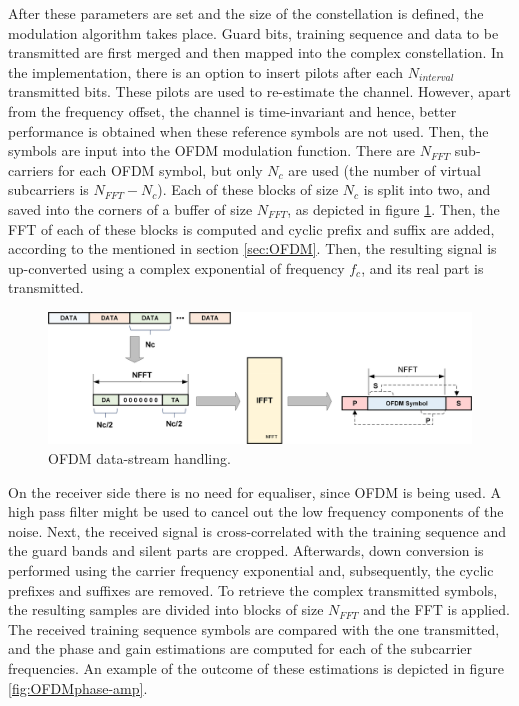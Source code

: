 \documentclass[12pt,a4paper,openright]{report}
\begin{document}
After these parameters are set and the size of the constellation is defined, the modulation algorithm takes place. Guard bits, training sequence and data to be transmitted are first merged and then mapped into the complex constellation. In the implementation, there is an option to insert pilots after each $N_{interval}$ transmitted bits. These pilots are used to re-estimate the channel. However, apart from the frequency offset, the channel is time-invariant and hence, better performance is obtained when these reference symbols are not used. Then, the symbols are input into the OFDM modulation function. There are $N_{FFT}$ sub-carriers for each OFDM symbol, but only $N_c$ are used (the number of virtual subcarriers is $N_{FFT}-N_c$). Each of these blocks of size $N_c$ is split into two, and saved into the corners of a buffer of size $N_{FFT}$, as depicted in figure \ref{fig:OFDMdata}. Then, the FFT of each of these blocks is computed and cyclic prefix and suffix are added, according to the mentioned in section \ref{sec:OFDM}. Then, the resulting signal is up-converted using a complex exponential of frequency  $f_c$, and its real part is transmitted.   

\begin{figure}[h]
  \centering
    \includegraphics[width=1\textwidth]{OFDMcAdaptTX.png}
    \caption[OFDM data-stream handling.]{OFDM data-stream handling.}
    \label{fig:OFDMdata}
\end{figure}


On the receiver side there is no need for equaliser, since OFDM is being used. A high pass filter might be used to cancel out the low frequency components of the noise. Next, the received signal is cross-correlated with the training sequence and the guard bands and silent parts are cropped. Afterwards, down conversion is performed using the carrier frequency exponential and, subsequently, the cyclic prefixes and suffixes are removed. To retrieve the complex transmitted symbols, the resulting samples are divided into blocks of size $N_{FFT}$ and the FFT is applied. The received training sequence symbols are compared with the one transmitted, and the phase and gain estimations are computed for each of the subcarrier frequencies. An example of the outcome of these estimations is depicted in figure \ref{fig:OFDMphase-amp}. 
\end{document}
